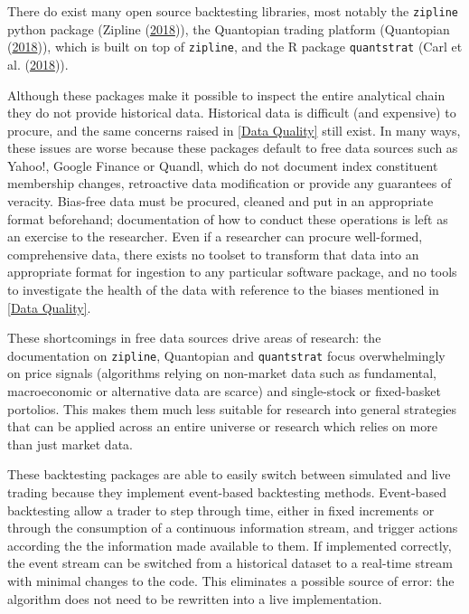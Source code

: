 \documentclass[11pt,preprint, authoryear]{elsarticle}
\numberwithin{equation}{section}
\numberwithin{figure}{section}
\numberwithin{table}{section}
\begin{document}
There do exist many open source backtesting libraries, most notably the
\texttt{zipline} python package (Zipline
(\protect\hyperlink{ref-Zipline2018}{2018})), the Quantopian trading
platform (Quantopian (\protect\hyperlink{ref-Quantopian2018}{2018})),
which is built on top of \texttt{zipline}, and the R package
\texttt{quantstrat} (Carl et al.
(\protect\hyperlink{ref-Carl2018}{2018})).

Although these packages make it possible to inspect the entire
analytical chain they do not provide historical data. Historical data is
difficult (and expensive) to procure, and the same concerns raised in
\ref{Data Quality} still exist. In many ways, these issues are worse
because these packages default to free data sources such as Yahoo!,
Google Finance or Quandl, which do not document index constituent
membership changes, retroactive data modification or provide any
guarantees of veracity. Bias-free data must be procured, cleaned and put
in an appropriate format beforehand; documentation of how to conduct
these operations is left as an exercise to the researcher. Even if a
researcher can procure well-formed, comprehensive data, there exists no
toolset to transform that data into an appropriate format for ingestion
to any particular software package, and no tools to investigate the
health of the data with reference to the biases mentioned in
\ref{Data Quality}.

These shortcomings in free data sources drive areas of research: the
documentation on \texttt{zipline}, Quantopian and \texttt{quantstrat}
focus overwhelmingly on price signals (algorithms relying on non-market
data such as fundamental, macroeconomic or alternative data are scarce)
and single-stock or fixed-basket portolios. This makes them much less
suitable for research into general strategies that can be applied across
an entire universe or research which relies on more than just market
data.

These backtesting packages are able to easily switch between simulated
and live trading because they implement event-based backtesting methods.
Event-based backtesting allow a trader to step through time, either in
fixed increments or through the consumption of a continuous information
stream, and trigger actions according the the information made available
to them. If implemented correctly, the event stream can be switched from
a historical dataset to a real-time stream with minimal changes to the
code. This eliminates a possible source of error: the algorithm does not
need to be rewritten into a live implementation.
\end{document}
